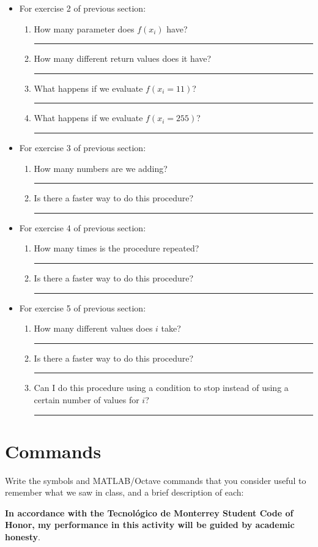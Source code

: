 \documentclass[spanish, 10pt]{article}
\newcommand{\shortresponserule}{{\large\rule{5 cm}{0.3mm}}}
\newcommand{\veryshortresponserule}{{\large\rule{3 cm}{0.3mm}}}
\begin{document}
\begin{itemize}
	\item For exercise 2 of previous section:
	\begin{enumerate}
        \item How many parameter does $f(x_i)$ have? \hfill \shortresponserule
        \item How many different return values does it have? \hfill \shortresponserule
        \item What happens if we evaluate $f(x_i=11)$? \hfill \shortresponserule
        \item What happens if we evaluate $f(x_i=255)$? \hfill \shortresponserule
    \end{enumerate}
	\item For exercise 3 of previous section:
	\begin{enumerate}
        \item How many numbers are we adding? \hfill \shortresponserule
        \item Is there a faster way to do this procedure? \hfill \veryshortresponserule
    \end{enumerate}
	\item For exercise 4 of previous section:
	\begin{enumerate}
        \item How many times is the procedure repeated? \hfill \shortresponserule
        \item Is there a faster way to do this procedure? \hfill \shortresponserule
    \end{enumerate}
    \item For exercise 5 of previous section:
	\begin{enumerate}
        \item How many different values does $i$ take? \hfill \shortresponserule
        \item Is there a faster way to do this procedure? \hfill \shortresponserule
        \item Can I do this procedure using a condition to stop instead of using a certain number of values for $i$?
        \hfill \shortresponserule
    \end{enumerate}
\end{itemize}

\section{Commands}

Write the symbols and MATLAB/Octave commands that you consider useful to remember what we saw in class, and a brief description of each:
\vfill

\textbf{In accordance with the Tecnológico de Monterrey Student Code of Honor, my performance in this activity will be guided by academic honesty}.
\end{document}
